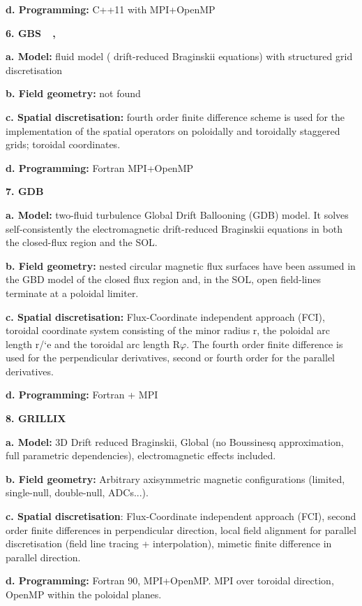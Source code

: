 \documentclass{article}
\begin{document}
\textbf{d. Programming: }C++11 with MPI+OpenMP

{ \textbf{6. GBS }}{~\cite{ref [14]}}{ \textbf{, 
}}{~\cite{ref [15]}}

\textbf{a. Model:} fluid model ({ drift-reduced}{\Large{}{  
}}Braginskii equations) with structured grid discretisation

\textbf{b. Field geometry:} not found

\textbf{c. Spatial discretisation: }fourth order finite difference scheme is used 
for the implementation of the spatial operators on poloidally and toroidally staggered 
grids; toroidal coordinates.

\textbf{d. Programming: }Fortran  MPI+OpenMP

{ \textbf{7. GDB }}{~\cite{ref [16]}}

\textbf{a. Model: }two-fluid turbulence Global Drift Ballooning (GDB) model. It 
solves self-consistently the electromagnetic drift-reduced Braginskii equations 
in both the closed-flux region and the SOL.

\textbf{b. Field geometry: }nested circular magnetic flux surfaces have been assumed 
in the GBD model of the closed flux region and, in the SOL, open field-lines terminate 
at a poloidal limiter.

\textbf{c. Spatial discretisation:} Flux-Coordinate independent approach (FCI), 
toroidal coordinate system consisting of the minor radius r, the poloidal arc length 
r/`e and the toroidal arc length R$\varphi$. The fourth order finite difference 
is used for the perpendicular derivatives, second or fourth order for the parallel 
derivatives.

\textbf{d. Programming: }Fortran + MPI

{ \textbf{8. GRILLIX }}{~\cite{ref [17]}}

\textbf{a. Model:} 3D Drift reduced Braginskii, Global (no Boussinesq approximation, 
full parametric dependencies), electromagnetic effects included.

\textbf{b. Field geometry:} Arbitrary axisymmetric magnetic configurations (limited, 
single-null, double-null, ADCs...).

\textbf{c. Spatial discretisation}: Flux-Coordinate independent approach (FCI), 
second order finite differences in perpendicular direction, local field alignment 
for parallel discretisation (field line tracing + interpolation), mimetic finite 
difference in parallel direction.

\textbf{d. Programming:} Fortran 90, MPI+OpenMP. MPI over toroidal direction, OpenMP 
within the poloidal planes.
\end{document}
